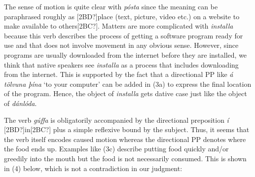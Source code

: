 \begin{styleStandard}
The sense of motion is quite clear with \textit{pósta} since the meaning can be paraphrased roughly as [2BD?]place (text, picture, video etc.) on a website to make available to others[2BC?]. Matters are more complicated with \textit{installa} because this verb describes the process of getting a software program ready for use and that does not involve movement in any obvious sense. However, since programs are usually downloaded from the internet before they are installed, we think that native speakers see \textit{installa }as a process that includes downloading from the internet. This is supported by the fact that a directional PP like \textit{á tölvuna þína }‘to your computer’ can be added in (3a) to express the final location of the program. Hence, the object of \textit{installa} gets dative case just like the object of \textit{dánlóda}. 
\end{styleStandard}

\begin{styleStandard}
The verb \textit{gúffa} is obligatorily accompanied by the directional preposition \textit{í} [2BD?]in[2BC?] plus a simple reflexive bound by the subject. Thus, it seems that the verb itself encodes caused motion whereas the directional PP denotes where the food ends up. Examples like (3c) describe putting food quickly and/or greedily into the mouth but the food is not necessarily consumed. This is shown in (4) below, which is not a contradiction in our judgment: 
\end{styleStandard}

